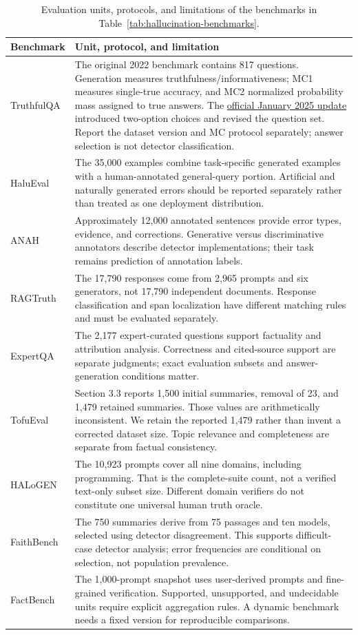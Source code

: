\begin{table}[tp]
\centering\small
\setlength{\tabcolsep}{5pt}\renewcommand{\arraystretch}{1.14}
\begin{tabularx}{\textwidth}{@{}p{}X@{}}\toprule
Benchmark & Unit, protocol, and limitation \\\midrule
TruthfulQA & The original 2022 benchmark contains 817 questions. Generation measures truthfulness/informativeness; MC1 measures single-true accuracy, and MC2 normalized probability mass assigned to true answers. The \href{https://github.com/sylinrl/TruthfulQA}{official January 2025 update} introduced two-option choices and revised the question set. Report the dataset version and MC protocol separately; answer selection is not detector classification. \\
HaluEval & The 35,000 examples combine task-specific generated examples with a human-annotated general-query portion. Artificial and naturally generated errors should be reported separately rather than treated as one deployment distribution. \\
ANAH & Approximately 12,000 annotated sentences provide error types, evidence, and corrections. Generative versus discriminative annotators describe detector implementations; their task remains prediction of annotation labels. \\
RAGTruth & The 17,790 responses come from 2,965 prompts and six generators, not 17,790 independent documents. Response classification and span localization have different matching rules and must be evaluated separately. \\
ExpertQA & The 2,177 expert-curated questions support factuality and attribution analysis. Correctness and cited-source support are separate judgments; exact evaluation subsets and answer-generation conditions matter. \\
TofuEval & Section 3.3 reports 1,500 initial summaries, removal of 23, and 1,479 retained summaries. Those values are arithmetically inconsistent. We retain the reported 1,479 rather than invent a corrected dataset size. Topic relevance and completeness are separate from factual consistency. \\
HALoGEN & The 10,923 prompts cover all nine domains, including programming. That is the complete-suite count, not a verified text-only subset size. Different domain verifiers do not constitute one universal human truth oracle. \\
FaithBench & The 750 summaries derive from 75 passages and ten models, selected using detector disagreement. This supports difficult-case detector analysis; error frequencies are conditional on selection, not population prevalence. \\
FactBench & The 1,000-prompt snapshot uses user-derived prompts and fine-grained verification. Supported, unsupported, and undecidable units require explicit aggregation rules. A dynamic benchmark needs a fixed version for reproducible comparisons. \\
\bottomrule\end{tabularx}
\caption{Evaluation units, protocols, and limitations of the benchmarks in Table~\ref{tab:hallucination-benchmarks}.}
\label{tab:benchmark-caveats}
\end{table}

